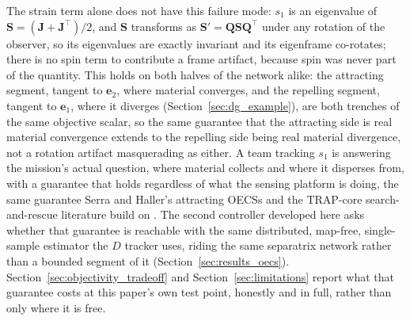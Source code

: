 \documentclass[lettersize,journal]{IEEEtran}
\begin{document}
The strain term alone does not have this failure mode: $s_1$ is an
eigenvalue of $\mathbf{S} = (\mathbf{J} + \mathbf{J}^\top)/2$, and
$\mathbf{S}$ transforms as $\mathbf{S}' = \mathbf{Q}\mathbf{S}
\mathbf{Q}^\top$ under any rotation of the observer, so its eigenvalues
are exactly invariant and its eigenframe co-rotates; there is no spin
term to contribute a frame artifact, because spin was never part of
the quantity. This holds on both halves of the network alike: the
attracting segment, tangent to $\mathbf{e}_2$, where material
converges, and the repelling segment, tangent to $\mathbf{e}_1$, where
it diverges (Section~\ref{sec:dg_example}), are both trenches of the
same objective scalar, so the same guarantee that the attracting side
is real material convergence extends to the repelling side being real
material divergence, not a rotation artifact masquerading as either.
A team tracking $s_1$ is answering the mission's actual question, where
material collects and where it disperses from, with a guarantee that
holds regardless of what the sensing platform is doing, the same
guarantee Serra and Haller's attracting OECSs and the TRAP-core
search-and-rescue literature build on \cite{17,36}. The second
controller developed here
asks whether that guarantee is reachable with the same distributed,
map-free, single-sample estimator the $D$ tracker uses, riding the same
separatrix network rather than a bounded segment of it
(Section~\ref{sec:results_oecs}). Section~\ref{sec:objectivity_tradeoff}
and Section~\ref{sec:limitations} report what that guarantee costs at
this paper's own test point, honestly and in full, rather than only
where it is free.
\end{document}
